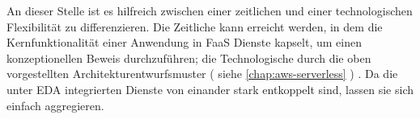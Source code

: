 \documentclass[
12pt,
english,
ngerman,
headsepline,
twoside,
openright,
numbers=noenddot,version=first
]{scrreprt}
\begin{document}

An dieser Stelle ist es hilfreich zwischen einer zeitlichen und einer technologischen Flexibilität zu differenzieren. Die Zeitliche kann erreicht werden, in dem die Kernfunktionalität einer Anwendung in \acrshort{FaaS} Dienste kapselt, um einen konzeptionellen Beweis durchzuführen; die Technologische durch die oben vorgestellten Architekturentwurfsmuster ( siehe \autoref{chap:aws-serverless} ) . Da die unter \acrshort{EDA} integrierten Dienste von einander stark entkoppelt sind, lassen sie sich einfach aggregieren.



\lstlistoflistings

\listoftables

%



\end{document}

